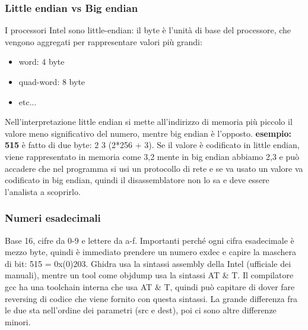 \documentclass{article}
\begin{document}
\subsubsection{Little endian vs Big endian}
I processori Intel sono little-endian: il byte è l'unità di base del processore, che vengono aggregati per rappresentare valori più grandi:
\begin{itemize}
\item word: 4 byte
\item quad-word: 8 byte
\item etc...
\end{itemize}
Nell'interpretazione little endian si mette all'indirizzo di memoria più piccolo il valore meno significativo del numero, mentre big endian è l'opposto. \textbf{esempio: 515} è fatto di due byte: 2 3 (2*256 + 3). Se il valore è codificato in little endian, viene rappresentato in memoria come 3,2 mente in big endian abbiamo 2,3 e può accadere che nel programma si usi un protocollo di rete e se va usato un valore va codificato in big endian, quindi il disassemblatore non lo sa e deve essere l'analista a scoprirlo.
\subsubsection{Numeri esadecimali}
Base 16, cifre da 0-9 e lettere da a-f. Importanti perché ogni cifra esadecimale è mezzo byte, quindi è immediato prendere un numero exdec e capire la maschera di bit: 515 = 0x(0)203. Ghidra usa la sintassi assembly della Intel (ufficiale dei manuali), mentre un tool come objdump usa la sintassi AT \& T. Il compilatore gcc ha una toolchain interna che usa AT \& T, quindi può capitare di dover fare reversing di codice che viene fornito con questa sintassi. La grande differenza fra le due sta nell'ordine dei parametri (src e dest), poi ci sono altre differenze minori.
\end{document}

